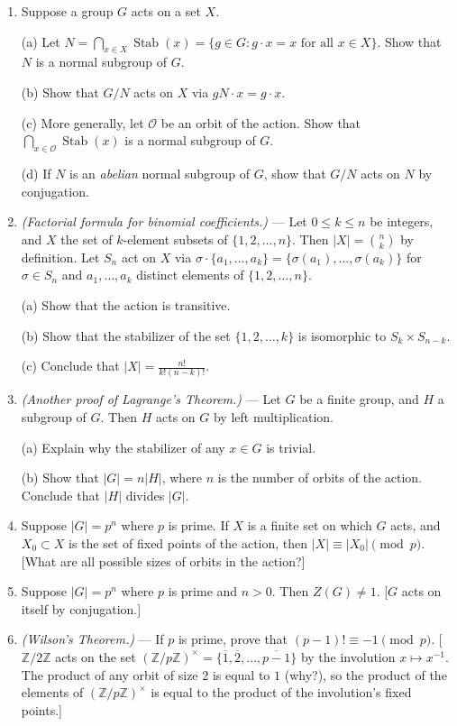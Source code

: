 \documentclass[leqno]{book}
\begin{document}
\begin{enumerate}
\item Suppose a group $G$ acts on a set $X$.

(a) Let $N=\bigcap_{x\in X}\operatorname{Stab}(x)=\{g\in G:g\cdot x=x\text{ for all }x\in X\}$.  Show that $N$ is a normal subgroup of $G$.

(b) Show that $G/N$ acts on $X$ via $gN\cdot x=g\cdot x$.

(c) More generally, let $\mathcal O$ be an orbit of the action.  Show that $\bigcap_{x\in\mathcal O}\operatorname{Stab}(x)$ is a normal subgroup of $G$.

(d) If $N$ is an \emph{abelian} normal subgroup of $G$, show that $G/N$ acts on $N$ by conjugation.

\item\emph{(Factorial formula for binomial coefficients.)} \---- Let $0\leqslant k\leqslant n$ be integers, and $X$ the set of $k$-element subsets of $\{1,2,\dots,n\}$.  Then $|X|={n\choose k}$ by definition.  Let $S_n$ act on $X$ via $\sigma\cdot\{a_1,\dots,a_k\}=\{\sigma(a_1),\dots,\sigma(a_k)\}$ for $\sigma\in S_n$ and $a_1,\dots,a_k$ distinct elements of $\{1,2,\dots,n\}$.

(a) Show that the action is transitive.

(b) Show that the stabilizer of the set $\{1,2,\dots,k\}$ is isomorphic to $S_k\times S_{n-k}$.

(c) Conclude that $|X|=\frac{n!}{k!(n-k)!}$.

\item\emph{(Another proof of Lagrange's Theorem.)} \---- Let $G$ be a finite group, and $H$ a subgroup of $G$.  Then $H$ acts on $G$ by left multiplication.

(a) Explain why the stabilizer of any $x\in G$ is trivial.

(b) Show that $|G|=n|H|$, where $n$ is the number of orbits of the action.  Conclude that $|H|$ divides $|G|$.

\item Suppose $|G|=p^n$ where $p$ is prime.  If $X$ is a finite set on which $G$ acts, and $X_0\subset X$ is the set of fixed points of the action, then $|X|\equiv|X_0|\pmod p$.  [What are all possible sizes of orbits in the action?]

\item Suppose $|G|=p^n$ where $p$ is prime and $n>0$.  Then $Z(G)\ne 1$.  [$G$ acts on itself by conjugation.]

\item\emph{(Wilson's Theorem.)} \---- If $p$ is prime, prove that $(p-1)!\equiv -1\pmod p$.  [$\mathbb Z/2\mathbb Z$ acts on the set $(\mathbb Z/p\mathbb Z)^\times=\{\overline 1,\overline 2,\dots,\overline{p-1}\}$ by the involution $x\mapsto x^{-1}$.  The product of any orbit of size $2$ is equal to $1$ (why?), so the product of the elements of $(\mathbb Z/p\mathbb Z)^\times$ is equal to the product of the involution's fixed points.]


\end{enumerate}
\end{document}
